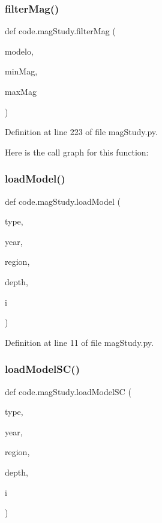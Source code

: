 \subsubsection{\texorpdfstring{filter\+Mag()}{filterMag()}}
{\footnotesize\ttfamily def code.\+mag\+Study.\+filter\+Mag (\begin{DoxyParamCaption}\item[{}]{modelo,  }\item[{}]{min\+Mag,  }\item[{}]{max\+Mag }\end{DoxyParamCaption})}



Definition at line 223 of file mag\+Study.\+py.

Here is the call graph for this function\+:
\mbox{\label{namespacecode_1_1mag_study_a15d2acf7101a98a829fc088787094a3d}} 
\subsubsection{\texorpdfstring{load\+Model()}{loadModel()}}
{\footnotesize\ttfamily def code.\+mag\+Study.\+load\+Model (\begin{DoxyParamCaption}\item[{}]{type,  }\item[{}]{year,  }\item[{}]{region,  }\item[{}]{depth,  }\item[{}]{i }\end{DoxyParamCaption})}



Definition at line 11 of file mag\+Study.\+py.

\mbox{\label{namespacecode_1_1mag_study_a6120f1fb76fd993f6e67c95d06e50327}} 
\subsubsection{\texorpdfstring{load\+Model\+S\+C()}{loadModelSC()}}
{\footnotesize\ttfamily def code.\+mag\+Study.\+load\+Model\+SC (\begin{DoxyParamCaption}\item[{}]{type,  }\item[{}]{year,  }\item[{}]{region,  }\item[{}]{depth,  }\item[{}]{i }\end{DoxyParamCaption})}



